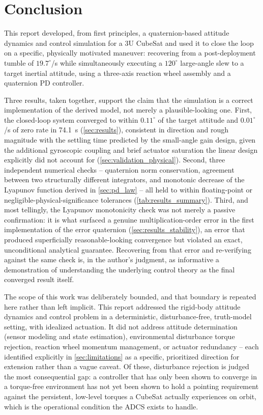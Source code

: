 \section{Conclusion}
\label{sec:conclusion}

This report developed, from first principles, a quaternion-based attitude dynamics and control simulation for a 3U CubeSat and used it to close the loop on a specific, physically motivated maneuver: recovering from a post-deployment tumble of $19.7^\circ$/s while simultaneously executing a $120^\circ$ large-angle slew to a target inertial attitude, using a three-axis reaction wheel assembly and a quaternion PD controller.

Three results, taken together, support the claim that the simulation is a correct implementation of the derived model, not merely a plausible-looking one. First, the closed-loop system converged to within $0.11^\circ$ of the target attitude and $0.01^\circ$/s of zero rate in \SI{74.1}{\second} (\cref{sec:results}), consistent in direction and rough magnitude with the settling time predicted by the small-angle gain design, given the additional gyroscopic coupling and brief actuator saturation the linear design explicitly did not account for (\cref{sec:validation_physical}). Second, three independent numerical checks -- quaternion norm conservation, agreement between two structurally different integrators, and monotonic decrease of the Lyapunov function derived in \cref{sec:pd_law} -- all held to within floating-point or negligible-physical-significance tolerances (\cref{tab:results_summary}). Third, and most tellingly, the Lyapunov monotonicity check was not merely a passive confirmation: it is what surfaced a genuine multiplication-order error in the first implementation of the error quaternion (\cref{sec:results_stability}), an error that produced superficially reasonable-looking convergence but violated an exact, unconditional analytical guarantee. Recovering from that error and re-verifying against the same check is, in the author's judgment, as informative a demonstration of understanding the underlying control theory as the final converged result itself.

The scope of this work was deliberately bounded, and that boundary is repeated here rather than left implicit. This report addressed the rigid-body attitude dynamics and control problem in a deterministic, disturbance-free, truth-model setting, with idealized actuation. It did not address attitude determination (sensor modeling and state estimation), environmental disturbance torque rejection, reaction wheel momentum management, or actuator redundancy -- each identified explicitly in \cref{sec:limitations} as a specific, prioritized direction for extension rather than a vague caveat. Of these, disturbance rejection is judged the most consequential gap: a controller that has only been shown to converge in a torque-free environment has not yet been shown to hold a pointing requirement against the persistent, low-level torques a CubeSat actually experiences on orbit, which is the operational condition the ADCS exists to handle.

